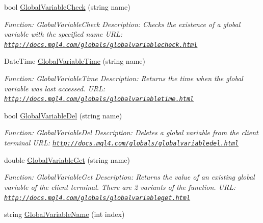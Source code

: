\begin{DoxyCompactItemize}
bool \hyperlink{class_m_q_l4_c_sharp_1_1_base_1_1_m_q_l_base_a852ffadff0dbb26c6219d7cca3e5d3db}{Global\+Variable\+Check} (string name)
\begin{DoxyCompactList}\small\item\em Function\+: Global\+Variable\+Check Description\+: Checks the existence of a global variable with the specified name U\+RL\+: \href{http://docs.mql4.com/globals/globalvariablecheck.html}{\tt http\+://docs.\+mql4.\+com/globals/globalvariablecheck.\+html} \end{DoxyCompactList}\item 
Date\+Time \hyperlink{class_m_q_l4_c_sharp_1_1_base_1_1_m_q_l_base_a50f15d94070d9ef987373cce47db68ba}{Global\+Variable\+Time} (string name)
\begin{DoxyCompactList}\small\item\em Function\+: Global\+Variable\+Time Description\+: Returns the time when the global variable was last accessed. U\+RL\+: \href{http://docs.mql4.com/globals/globalvariabletime.html}{\tt http\+://docs.\+mql4.\+com/globals/globalvariabletime.\+html} \end{DoxyCompactList}\item 
bool \hyperlink{class_m_q_l4_c_sharp_1_1_base_1_1_m_q_l_base_a577b99c5c27d49c732bdd0e299b1c217}{Global\+Variable\+Del} (string name)
\begin{DoxyCompactList}\small\item\em Function\+: Global\+Variable\+Del Description\+: Deletes a global variable from the client terminal U\+RL\+: \href{http://docs.mql4.com/globals/globalvariabledel.html}{\tt http\+://docs.\+mql4.\+com/globals/globalvariabledel.\+html} \end{DoxyCompactList}\item 
double \hyperlink{class_m_q_l4_c_sharp_1_1_base_1_1_m_q_l_base_a8a83efec01c5181ebcdcdd96778844ab}{Global\+Variable\+Get} (string name)
\begin{DoxyCompactList}\small\item\em Function\+: Global\+Variable\+Get Description\+: Returns the value of an existing global variable of the client terminal. There are 2 variants of the function. U\+RL\+: \href{http://docs.mql4.com/globals/globalvariableget.html}{\tt http\+://docs.\+mql4.\+com/globals/globalvariableget.\+html} \end{DoxyCompactList}\item 
string \hyperlink{class_m_q_l4_c_sharp_1_1_base_1_1_m_q_l_base_ae397a6d7b0423cd9fcec05751a0ccedd}{Global\+Variable\+Name} (int index)

\end{DoxyCompactItemize}

